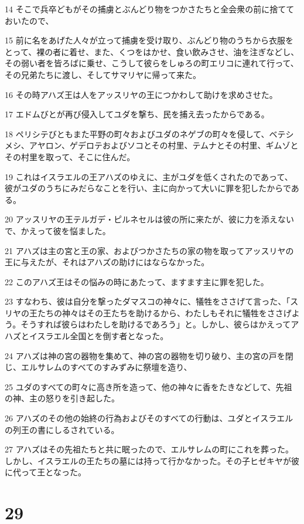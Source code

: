 \par 14 そこで兵卒どもがその捕虜とぶんどり物をつかさたちと全会衆の前に捨てておいたので、
\par 15 前に名をあげた人々が立って捕虜を受け取り、ぶんどり物のうちから衣服をとって、裸の者に着せ、また、くつをはかせ、食い飲みさせ、油を注ぎなどし、その弱い者を皆ろばに乗せ、こうして彼らをしゅろの町エリコに連れて行って、その兄弟たちに渡し、そしてサマリヤに帰って来た。
\par 16 その時アハズ王は人をアッスリヤの王につかわして助けを求めさせた。
\par 17 エドムびとが再び侵入してユダを撃ち、民を捕え去ったからである。
\par 18 ペリシテびともまた平野の町々およびユダのネゲブの町々を侵して、ベテシメシ、アヤロン、ゲデロテおよびソコとその村里、テムナとその村里、ギムゾとその村里を取って、そこに住んだ。
\par 19 これはイスラエルの王アハズのゆえに、主がユダを低くされたのであって、彼がユダのうちにみだらなことを行い、主に向かって大いに罪を犯したからである。
\par 20 アッスリヤの王テルガデ・ピルネセルは彼の所に来たが、彼に力を添えないで、かえって彼を悩ました。
\par 21 アハズは主の宮と王の家、およびつかさたちの家の物を取ってアッスリヤの王に与えたが、それはアハズの助けにはならなかった。
\par 22 このアハズ王はその悩みの時にあたって、ますます主に罪を犯した。
\par 23 すなわち、彼は自分を撃ったダマスコの神々に、犠牲をささげて言った、「スリヤの王たちの神々はその王たちを助けるから、わたしもそれに犠牲をささげよう。そうすれば彼らはわたしを助けるであろう」と。しかし、彼らはかえってアハズとイスラエル全国とを倒す者となった。
\par 24 アハズは神の宮の器物を集めて、神の宮の器物を切り破り、主の宮の戸を閉じ、エルサレムのすべてのすみずみに祭壇を造り、
\par 25 ユダのすべての町々に高き所を造って、他の神々に香をたきなどして、先祖の神、主の怒りを引き起した。
\par 26 アハズのその他の始終の行為およびそのすべての行動は、ユダとイスラエルの列王の書にしるされている。
\par 27 アハズはその先祖たちと共に眠ったので、エルサレムの町にこれを葬った。しかし、イスラエルの王たちの墓には持って行かなかった。その子ヒゼキヤが彼に代って王となった。

\chapter{29}

